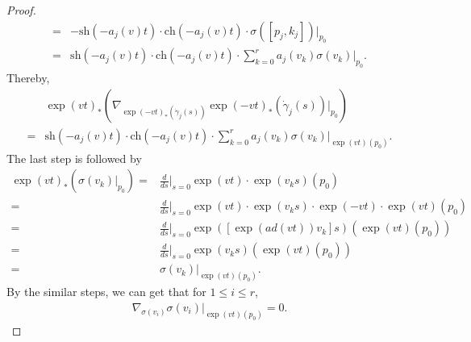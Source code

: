 \documentclass[10pt,a4paper]{amsart}
\begin{document}
\begin{proof}
\begin{align*}
        =& -\mathrm{sh}(-a_j(v)t)\cdot \mathrm{ch}(-a_j(v)t)\cdot\sigma([p_j, k_j])|_{p_0}\\
        =& \mathrm{sh}(-a_j(v)t)\cdot \mathrm{ch}(-a_j(v)t)\cdot \sum_{k = 0}^{r}a_j(v_k)\sigma(v_k)|_{p_0}. 
    \end{align*}
    Thereby, 
    \begin{align*}
        &\exp(vt)_*(\nabla_{\exp(-vt)_*(\dot\gamma_j(s))}\exp(-vt)_*(\dot\gamma_j(s))|_{p_0})\\
        =& \mathrm{sh}(-a_j(v)t)\cdot \mathrm{ch}(-a_j(v)t)\cdot \sum_{k = 0}^{r}a_j(v_k)\sigma(v_k)|_{\exp(vt)(p_0)}.
    \end{align*}
    The last step is followed by 
    \begin{align*}
        \exp(vt)_*(\sigma(v_k)|_{p_0}) 
        =& \frac{d}{ds} \bigg|_{s = 0} \exp(vt)\cdot \exp(v_ks)(p_0)\\
        =& \frac{d}{ds} \bigg|_{s = 0} \exp(vt)\cdot \exp(v_ks)\cdot \exp(-vt)\cdot \exp(vt)(p_0)\\
        =& \frac{d}{ds} \bigg|_{s = 0} \exp([\exp(ad(vt))v_k]s)(\exp(vt)(p_0))\\
        =& \frac{d}{ds} \bigg|_{s = 0} \exp(v_ks)(\exp(vt)(p_0))\\
        =& \sigma(v_k)|_{\exp(vt)(p_0)}.
    \end{align*}
    By the similar steps, we can get that for $1 \leq i \leq r$, 
    \begin{align*}
        \nabla_{\sigma(v_i)}\sigma(v_i)|_{\exp(vt)(p_0)} = 0.
    \end{align*}
\end{proof}
\end{document}
